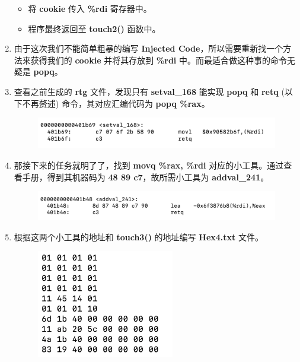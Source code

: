 \begin{enumerate}
                \begin{itemize}
                    \item 将 \textbf{cookie} 传入 \textbf{\%rdi} 寄存器中。
                    \item 程序最终返回至 \textbf{touch2()} 函数中。
                \end{itemize}    
            \item 由于这次我们不能简单粗暴的编写 \textbf{Injected Code}，所以需要重新找一个方法来获得我们的 \textbf{cookie} 并将其存放到 \textbf{\%rdi} 中。而最适合做这种事的命令无疑是 \textbf{popq}。
            \item 查看之前生成的 \textbf{rtg} 文件，发现只有 \textbf{setval\_168} 能实现 \textbf{popq} 和 \textbf{retq} (以下不再赘述) 命令，其对应汇编代码为 \textbf{popq \%rax}。
                \begin{figure}[htbp]
                    \hspace*{1.5cm}
                    \includegraphics*[width = 12cm]{s4_0.png}
                \end{figure}
            \item 那接下来的任务就明了了，找到 \textbf{movq \%rax, \%rdi} 对应的小工具。通过查看手册，得到其机器码为 \textbf{48 89 c7}，故所需小工具为 \textbf{addval\_241}。
                \begin{figure}[htbp]
                    \hspace*{1.5cm}
                    \includegraphics*[width = 12cm]{s4_1.png}
                \end{figure}
            \item 根据这两个小工具的地址和 \textbf{touch3()} 的地址编写 \textbf{Hex4.txt} 文件。
                \begin{figure}[htbp]
                    \hspace*{1.5cm}
                    \includegraphics*[width = 6cm]{s4_2.png}

\end{figure}
\end{enumerate}
